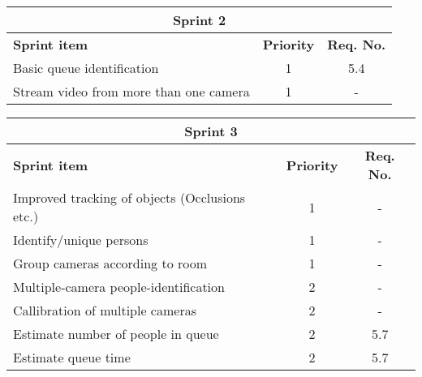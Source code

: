 \label{sprint2}
\begin{center}
	\begin{Large}
	\begin{tabular}{|p{10.5cm}|c|c|}
		\hline
		\multicolumn{3}{|c|}{\textbf{Sprint 2}} \\
		\hline
		\large{\textbf{Sprint item}} & \large{\textbf{Priority}} & \large{\textbf{Req. No.}} \\
		\hline
		\large{Basic queue identification} & \large{1} & 5.4 \\
		\hline
		\large{Stream video from more than one camera} & \large{1} & - \\
		\hline
	\end{tabular}
	\end{Large}
\end{center}



\label{sprint3}
\begin{center}
	\begin{Large}
	\begin{tabular}{|p{10.5cm}|c|c|}
		\hline
		\multicolumn{3}{|c|}{\textbf{Sprint 3}} \\
		\hline
		\large{\textbf{Sprint item}} & \large{\textbf{Priority}} & \large{\textbf{Req. No.}} \\
		\hline
		\large{Improved tracking of objects (Occlusions etc.)} & \large{1} & - \\
		\hline	
		\large{Identify/unique persons} & \large{1} & - \\
		\hline	
		\large{Group cameras according to room} & \large{1} & - \\
		\hline
		\large{Multiple-camera people-identification} & \large{2} & - \\
		\hline
		\large{Callibration of multiple cameras} & \large{2} & - \\
		\hline
		\large{Estimate number of people in queue} & \large{2} & 5.7 \\
		\hline
		\large{Estimate queue time} & \large{2} & 5.7 \\
		\hline
	\end{tabular}
	\end{Large}
\end{center}



